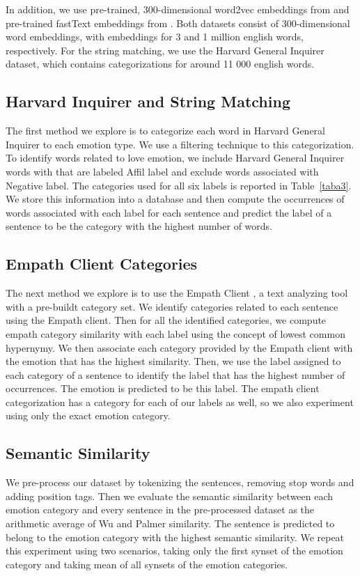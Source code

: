 \documentclass[conference]{IEEEtran}
\begin{document}
In addition, we use pre-trained, 300-dimensional word2vec embeddings  from \cite{mikolov2013distributed} and pre-trained fastText embeddings from \cite{bojanowski2016enriching}. Both datasets consist of 300-dimensional word embeddings, with embeddings for 3 and 1 million english words, respectively. For the string matching, we use the Harvard General Inquirer dataset, which contains categorizations for around 11 000 english words.

\subsection{Harvard Inquirer and String Matching}
The first method we explore is to categorize each word in Harvard General Inquirer \cite{harvardgeneralinquirer} to each emotion type. We use a filtering technique to this categorization. To identify words related to love emotion, we include Harvard General Inquirer words with that are labeled Affil label and exclude words associated with Negative label. The categories used for all six labels is reported in Table~\ref{taba3}. We store this information into a database and then compute the occurrences of words associated with each label for each sentence and predict the label of a sentence to be the category with the highest number of words.

\subsection{Empath Client Categories}
The next method we explore is to use the Empath Client \cite{empathclient}, a text analyzing tool with a pre-buildt category set. We identify categories related to each sentence using the Empath client. Then for all the identified categories, we compute empath category similarity with each label using the concept of lowest common hypernymy. We then associate each category provided by the Empath client with the emotion that has the highest similarity. Then, we use the label assigned to each category of a sentence to identify the label that has the highest number of occurrences. The emotion is predicted to be this label. The empath client categorization has a category for each of our labels as well, so we also experiment using only the exact emotion category.

\subsection{Semantic Similarity}
We pre-process our dataset by tokenizing the sentences, removing stop words and adding position tags. Then we evaluate the semantic similarity between each emotion category and every sentence in the pre-processed dataset as the arithmetic average of Wu and Palmer similarity. The sentence is predicted to belong to the emotion category with the highest semantic similarity. We repeat this experiment using two scenarios, taking only the first synset of the emotion category and taking mean of all synsets of the emotion categories. 
\end{document}
